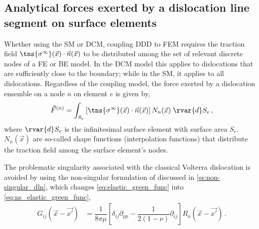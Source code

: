 \subsection{Analytical forces exerted by a dislocation line segment on surface elements}
\label{ss:analytic_forces}
Whether using the SM or DCM, coupling DDD to FEM requires the traction field $ \tns{\sigma^{\infty}}(\vec{x}) \cdot \vec{n}(\vec{x}) $ to be distributed among the set of relevant discrete nodes of a FE or BE model. In the DCM model this applies to dislocations that are sufficiently close to the boundary; while in the SM, it applies to all dislocations.
Regardless of the coupling model, the force exerted by a dislocation ensemble on a node $ n $ on element $ e $ is given by,
\begin{align}\label{eq:ddd_fem_force_intro}
    \vec{F}^{(n)} = \int_{S_{e}} \left[\tns{\sigma^{\infty}}(\vec{x}) \cdot \vec{n}(\vec{x})\right] N_{n}(\vec{x})\; \rvar{d}S_{e}\,,
\end{align}
where $ \rvar{d}S_{e} $ is the infinitesimal surface element with surface area $ S_{e} $. $ N_{n}(\vec{x}) $ are so-called shape functions (interpolation functions) that distribute the traction field among the surface element's nodes.

The problematic singularity associated with the classical Volterra dislocation is avoided by using the non-singular formulation of \citet{a_non-singular_continuum_theory_of_dislocations} discussed in \cref{ss:non-singular_dln}, which changes \cref{eq:elastic_green_func} into \cref{eq:ns_elastic_green_func},
\begin{align}\label{eq:ns_elastic_green_func}
    G_{ij}(\vec{x} - \vec{x'}) & = \dfrac{1}{8\pi \mu}\left[ \delta_{ij} \partial_{pp} - \dfrac{1}{2(1-\nu)} \partial_{ij} \right] R_{a}(\vec{x} - \vec{x'})\,.
\end{align}

